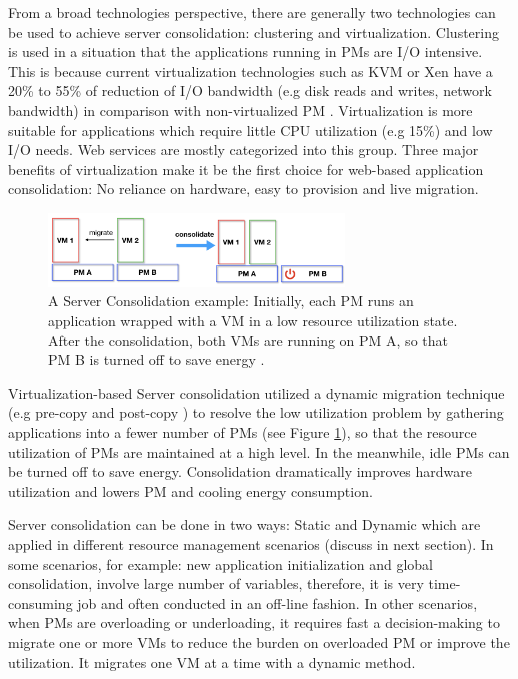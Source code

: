 From a broad technologies perspective, there are generally two technologies can be used to achieve server consolidation: clustering and virtualization. Clustering is used in a situation that the applications running in PMs are I/O intensive. This is because current virtualization technologies  such as KVM \cite{Kivity:2007wu} or Xen \cite{Barham:2003cj} have a 20\% to 55\% of reduction of I/O bandwidth (e.g disk reads and writes, network bandwidth) in comparison with non-virtualized PM \cite{Shafer:2010vh}. Virtualization is more suitable for applications which require little CPU utilization (e.g 15\%) and low I/O needs. Web services are mostly categorized into this group. Three major benefits of virtualization make it be the first choice for web-based application consolidation: No reliance on hardware, easy to provision and live migration.

\begin{figure}
	\centering
	\includegraphics[width=0.7\textwidth]{pics/consolidate.png}
	\caption{A Server Consolidation example: Initially, each PM runs an application wrapped with a VM in a low resource utilization state. After the consolidation, both VMs are running on PM A, so that PM B is turned off to save energy \cite{Barroso:2007jt}.}
	\label{fig:consolidation}
\end{figure}

Virtualization-based Server consolidation \cite{Zhang:2010vo} utilized a dynamic migration technique (e.g pre-copy \cite{Clark:2005ud} and post-copy \cite{Hines:2009fv}) to resolve the low utilization problem by gathering applications into a fewer number of PMs (see Figure \ref{fig:consolidation}), so that the resource utilization of PMs are maintained at a high level. In the meanwhile, idle PMs can be turned off to save energy. Consolidation dramatically improves hardware utilization and lowers PM and cooling energy consumption. 

Server consolidation can be done in two ways: Static and Dynamic \cite{Xiao:2015ik, Verma:2009wi} which are applied in different resource management scenarios (discuss in next section). In some scenarios, for example: new application initialization and global consolidation, involve large number of variables, therefore, it is very time-consuming job and often conducted in an off-line fashion. In other scenarios, when PMs are overloading or underloading, it requires fast a decision-making to migrate one or more VMs to reduce the burden on overloaded PM or improve the utilization. It migrates one VM at a time with a dynamic method. 




